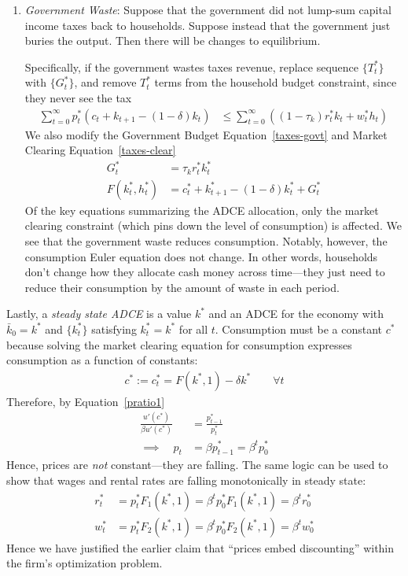 \documentclass[12pt]{article}
\theoremstyle{plain}
\theoremstyle{definition}
\theoremstyle{remark}
\newcommand{\sumtinfz}{\sum^\infty_{t=0}}
\begin{document}
\begin{enumerate}
  \item \emph{Government Waste}: Suppose that the government did not
    lump-sum capital income taxes back to households. Suppose instead
    that the government just buries the output. Then there will be
    changes to equilibrium.

    Specifically, if the government wastes taxes revenue, replace
    sequence $\{T^*_t\}$ with $\{G^*_t\}$, and remove $T^*_t$ terms from
    the household budget constraint, since they never see the tax
    \begin{align*}
        \sumtinfz p^*_t(c_t + k_{t+1}-(1-\delta)k_t) &\leq
        \sumtinfz ((1-\tau_k)r^*_t k_t + w^*_t h_t)
    \end{align*}
    We also modify the Government Budget Equation~\ref{taxes-govt} and
    Market Clearing Equation~\ref{taxes-clear}
    \begin{align*}
      G^*_t &=  \tau_k r^*_t k^*_t \\
      F(k^*_t,h_t^*) &= c_t^* + k^*_{t+1} - (1-\delta)k_t^* + G^*_t
    \end{align*}
    Of the key equations summarizing the ADCE allocation, only the
    market clearing constraint (which pins down the level of
    consumption) is affected. We see that the government waste reduces
    consumption.
    Notably, however, the consumption Euler equation does not change. In
    other words, households don't change how they allocate cash money
    across time---they just need to reduce their consumption by the
    amount of waste in each period.
\end{enumerate}
Lastly, a \emph{steady state ADCE} is a value $k^*$ and an ADCE for the
economy with $\bar{k}_0=k^*$ and $\{k_t^*\}$ satisfying $k^*_t=k^*$ for
all $t$. Consumption must be a constant $c^*$ because solving the market
clearing equation for consumption expresses consumption as a function of
constants:
\begin{align*}
  c^* := c_t^* = F(k^*,1) - \delta k^*
  \qquad \forall t
\end{align*}
Therefore, by Equation~\ref{pratio1}
\begin{align*}
  \frac{u'(c^*)}{\beta u'(c^*)} &= \frac{p_{t-1}^*}{p_t^*} \\
  \implies \quad p_t &= \beta p_{t-1}^* = \beta^t p_0^*
\end{align*}
Hence, prices are \emph{not} constant---they are falling. The same logic
can be used to show that wages and rental rates are falling
monotonically in steady state:
\begin{align*}
  r_t^* &= p_t^* F_1(k^*,1) = \beta^t p_0^* F_1(k^*,1) = \beta^t r_0^*\\
  w_t^* &= p_t^* F_2(k^*,1) = \beta^t p_0^* F_2(k^*,1) = \beta^t w_0^*
\end{align*}
Hence we have justified the earlier claim that ``prices embed
discounting'' within the firm's optimization problem.
\end{document}
